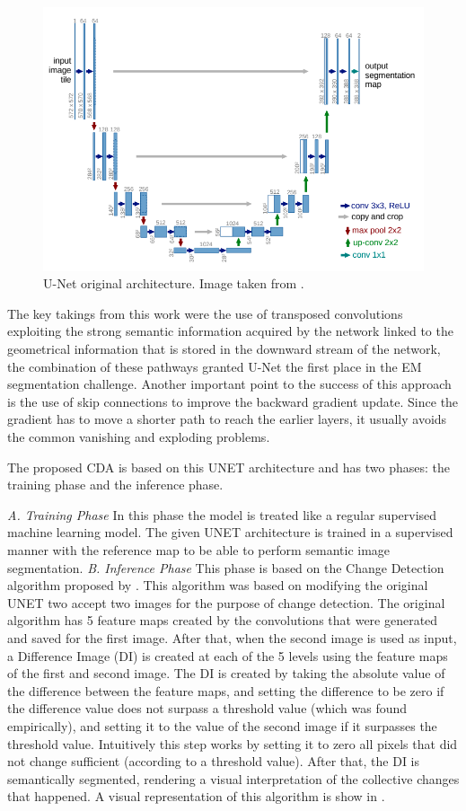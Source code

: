 \begin{figure}[H]
    \includegraphics[width=.7\textwidth]{Cap2-Methods/screenshot_1.png}
    \centering
	\caption{U-Net original architecture. Image taken from \cite{unet_gordo}.}
	\label{unetimg}
\end{figure}

The key takings from this work were the use of transposed convolutions exploiting the strong semantic information acquired by the network linked to the geometrical information that is stored in the downward stream of the network, the combination of these pathways granted U-Net the first place in the EM segmentation challenge. Another important point to the success of this approach is the use of skip connections to improve the backward gradient update. Since the gradient has to move a shorter path to reach the earlier layers, it usually avoids the common vanishing and exploding problems.

The proposed CDA is based on this UNET architecture and has two phases: the training phase and the inference phase.

\textit{A. Training Phase}
\newline
In this phase the model is treated like a regular supervised machine learning model. The given UNET architecture is trained in a supervised manner with the reference map
to be able to perform semantic image segmentation. 
\newline
\textit{B. Inference Phase}
\newline
This phase is based on the Change Detection algorithm proposed by \cite{Kevin}. This algorithm was based on modifying the original UNET two accept two images for the purpose of change detection.
The original algorithm has 5 feature maps created by the convolutions that were generated and saved for the first image. After that, when the second image is used as input, a Difference Image (DI) is
created at each of the 5 levels using the feature maps of the first and second image.
The DI is created by taking the absolute value of the difference between the feature maps, and setting the difference to be zero if the difference value does not surpass a threshold value (which was found empirically), and setting it to 
the value of the second image if it surpasses the threshold value. Intuitively this step works by setting it to zero all pixels that did not change sufficient (according to a threshold value). After that, the DI is semantically segmented, rendering a visual 
interpretation of the collective changes that happened. A visual representation of this algorithm is show in .

